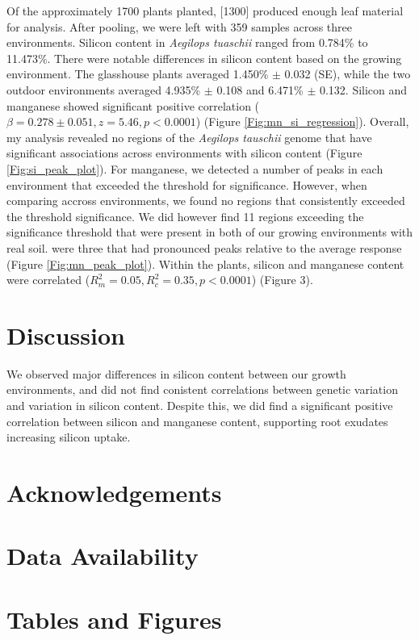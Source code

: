 \documentclass[12pt, letterpaper, ]{report}
\begin{document}
Of the approximately 1700 plants planted, [1300] produced enough leaf material for analysis. After pooling, we were left with 359 samples across three environments. Silicon content in \textit{Aegilops tuaschii} ranged from 0.784\% to 11.473\%. There were notable differences in silicon content based on the growing environment. The glasshouse plants averaged 1.450\% $\pm$ 0.032 (SE), while the two outdoor environments averaged 4.935\% $\pm$ 0.108 and 6.471\% $\pm$ 0.132. Silicon and manganese showed significant positive correlation ($\beta = 0.278\pm0.051, z = 5.46, p<0.0001$) (Figure \ref{Fig:mn_si_regression}). Overall, my analysis revealed no regions of the \textit{Aegilops tauschii} genome that have significant associations across environments with silicon content (Figure \ref{Fig:si_peak_plot}). For manganese, we detected a number of peaks in each environment that exceeded the threshold for significance. However, when comparing accross environments, we found no regions that consistently exceeded the threshold significance. We did however find 11 regions exceeding the significance threshold that were present in both of our growing environments with real soil.  were three that had pronounced peaks relative to the average response (Figure \ref{Fig:mn_peak_plot}). Within the plants, silicon and manganese content were correlated ($R^2_m = 0.05, R^2_c = 0.35 , p < 0.0001$) (Figure 3). 

\section{Discussion}

We observed major differences in silicon content between our growth environments, and did not find conistent correlations between genetic variation and variation in silicon content. Despite this, we did find a significant positive correlation between silicon and manganese content, supporting root exudates increasing silicon uptake. 

\section{Acknowledgements}

\section{Data Availability}

\printbibliography

\section{Tables and Figures}
\end{document}
